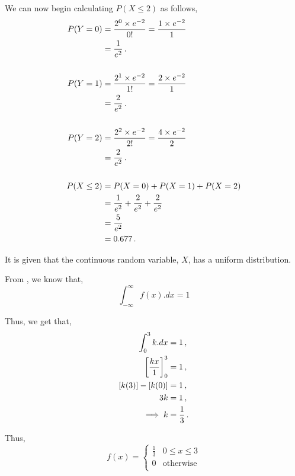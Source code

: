 \begin{subquestions}
We can now begin calculating $P(X \leq 2)$ as follows,
\begin{align}
	P(Y=0) & = \frac{2^0 \times e^{-2}}{0!} 
             = \frac{1 \times e^{-2}}{1} \nonumber \\
	       & = \frac{1}{e^2} \,. \\	\nonumber \\
	P(Y=1) & = \frac{2^1 \times e^{-2}}{1!} 
	         = \frac{2 \times e^{-2}}{1} \nonumber \\
	       & = \frac{2}{e^2} \,. \\	\nonumber \\       
	P(Y=2) & = \frac{2^2 \times e^{-2}}{2!} 
	         = \frac{4 \times e^{-2}}{2} \nonumber \\
	       & = \frac{2}{e^2} \,. \\ \nonumber \\     
	P(X \leq 2) & = P(X=0)+P(X=1)+P(X=2) \nonumber \\
	            & = \frac{1}{e^2} + \frac{2}{e^2} + \frac{2}{e^2} \nonumber \\
	            & = \frac{5}{e^2} \nonumber \\
	            & = 0.677 \,. 
\end{align}


\subquestion

It is given that the continuous random variable, $X$, has a uniform distribution.

\begin{subsubquestions}
	
\subsubquestion

From , we know that,
\begin{equation}
	\int_{-\infty}^{\infty} f(x).dx = 1
\end{equation}

Thus, we get that,
\begin{align}
	\int_{0}^{3} k.dx & = 1 \,, \nonumber \\
	\left[\frac{kx}{1} \right]_0^3 & = 1 \,, \nonumber \\
	[k(3)]-[k(0)] & = 1 \,, \nonumber \\
	3k & = 1 \,, \nonumber \\
	\implies k & = \frac{1}{3} \,.
\end{align}

Thus,
\[
f(x) =
\begin{cases}
	\frac{1}{3} & \text{$0 \leq x \leq 3$} \\
	0    & \text{otherwise} \\
\end{cases}
\]


\end{subsubquestions}
\end{subquestions}
